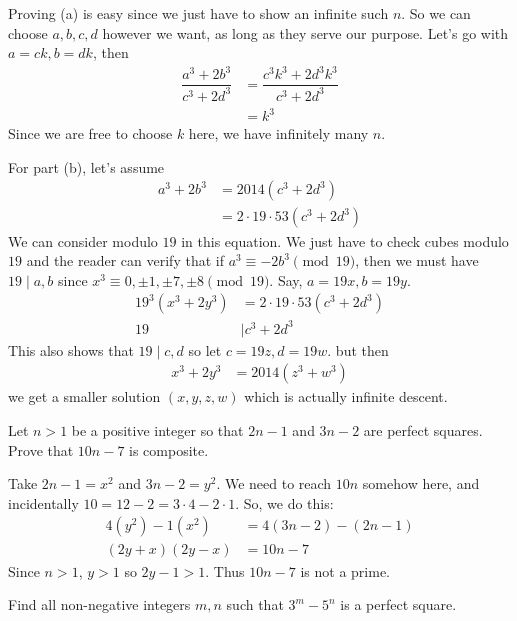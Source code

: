\begin{solution}
	Proving (a) is easy since we just have to show an infinite such $n$. So we can choose $a,b,c,d$ however we want, as long as they serve our purpose. Let's go with $a=ck,b=dk$, then
		\begin{align*}
			\dfrac{a^3+2b^3}{c^3+2d^3}  & = \dfrac{c^3k^3+2d^3k^3}{c^3+2d^3}\\
										& = k^3
		\end{align*}
	Since we are free to choose $k$ here, we have infinitely many $n$.

	For part (b), let's assume
		\begin{align*}
			a^3+2b^3 & = 2014(c^3+2d^3)\\
				 & = 2\cdot19\cdot53(c^3+2d^3)
		\end{align*}
	We can consider modulo $19$ in this equation. We just have to check cubes modulo $19$ and the reader can verify that if $a^3\equiv-2b^3\pmod{19}$, then we must have $19\mid a,b$ since $x^3\equiv0,\pm1,\pm7,\pm8\pmod{19}$. Say, $a=19x,b=19y$.
		\begin{align*}
			19^3(x^3+2y^3) & = 2\cdot19\cdot53(c^3+2d^3)\\
			19 & \mid c^3+2d^3
		\end{align*}
	This also shows that $19\mid c,d$ so let $c=19z,d=19w$. but then
		\begin{align*}
			x^3+2y^3 & = 2014(z^3+w^3)
		\end{align*}
	we get a smaller solution $(x,y,z,w)$ which is actually infinite descent.
\end{solution}

\begin{problem}[Croatia $2015$]
	Let $n>1$ be a positive integer so that $2n-1$ and $3n-2$ are perfect squares. Prove that $10n-7$ is composite.
\end{problem}

\begin{solution}
	Take $2n-1=x^2$ and $3n-2=y^2$. We need to reach $10n$ somehow here, and incidentally $10=12-2=3\cdot4-2\cdot1$. So, we do this:
		\begin{align*}
			4(y^2)-1(x^2) & = 4(3n-2)-(2n-1)\\
			(2y+x)(2y-x)  & = 10n-7
		\end{align*}
	Since $n>1$, $y>1$ so $2y-1>1$. Thus $10n-7$ is not a prime.
\end{solution}

\begin{problem}
	Find all non-negative integers $m, n$ such that $3^m-5^n$ is a perfect square.
\end{problem}

